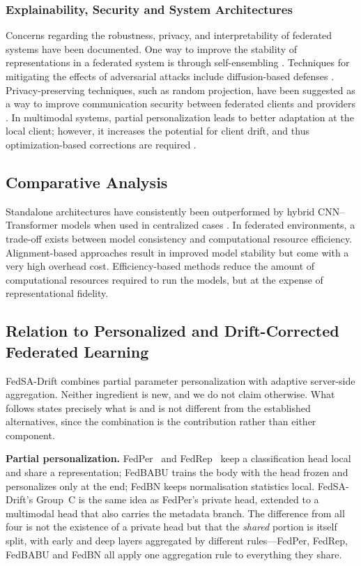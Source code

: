 \documentclass{ieeeaccess}
\newcommand{\sadrift}{FedSA-Drift}
\begin{document}
\subsubsection{Explainability, Security and System Architectures}
Concerns regarding the robustness, privacy, and interpretability of federated systems have been documented. One way to improve the stability of representations in a federated system is through self-ensembling \cite{Almalik2022}. Techniques for mitigating the effects of adversarial attacks include diffusion-based defenses \cite{Imam2023}. Privacy-preserving techniques, such as random projection, have been suggested as a way to improve communication security between federated clients and providers \cite{Narimani2024}. In multimodal systems, partial personalization leads to better adaptation at the local client; however, it increases the potential for client drift, and thus optimization-based corrections are required \cite{Zhu2025}.
\subsection{Comparative Analysis}
Standalone architectures have consistently been outperformed by hybrid CNN–Transformer models when used in centralized cases \cite{Naeem2025,Alshdaifat2025}. In federated environments, a trade-off exists between model consistency and computational resource efficiency. Alignment-based approaches result in improved model stability but come with a very high overhead cost. Efficiency-based methods reduce the amount of computational resources required to run the models, but at the expense of representational fidelity.
\subsection{Relation to Personalized and Drift-Corrected Federated Learning}
\label{sec:positioning}

\sadrift{} combines partial parameter personalization with adaptive server-side aggregation. Neither ingredient is new, and we do not claim otherwise. What follows states precisely what is and is not different from the established alternatives, since the combination is the contribution rather than either component.

\textbf{Partial personalization.} FedPer~\cite{Collins2021} and FedRep~\cite{Collins2021} keep a classification head local and share a representation; FedBABU trains the body with the head frozen and personalizes only at the end; FedBN keeps normalisation statistics local. \sadrift{}'s Group~C is the same idea as FedPer's private head, extended to a multimodal head that also carries the metadata branch. The difference from all four is not the existence of a private head but that the \emph{shared} portion is itself split, with early and deep layers aggregated by different rules---FedPer, FedRep, FedBABU and FedBN all apply one aggregation rule to everything they share.
\end{document}

